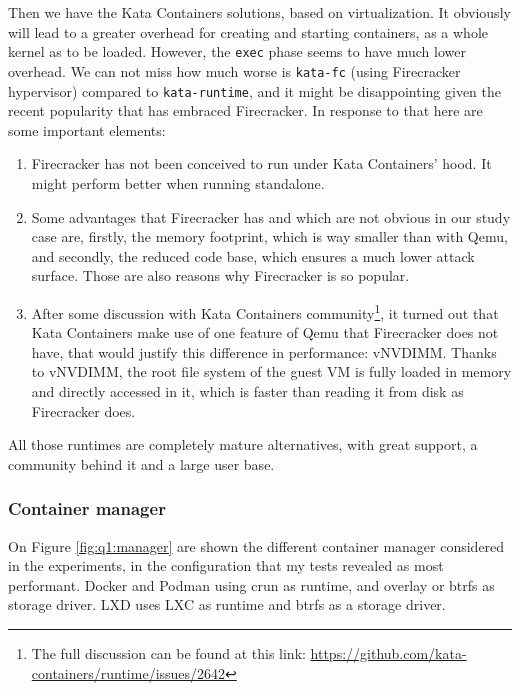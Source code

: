 Then we have the Kata Containers solutions, based on virtualization.  It obviously will lead to a greater overhead for creating and starting containers, as a whole kernel as to be loaded.  However, the \texttt{exec} phase seems to have much lower overhead.  We can not miss how much worse is \texttt{kata-fc} (using Firecracker hypervisor) compared to \texttt{kata-runtime}, and it might be disappointing given the recent popularity that has embraced Firecracker.  In response to that here are some important elements:
\begin{enumerate}
  \item Firecracker has not been conceived to run under Kata Containers' hood.  It might perform better when running standalone.
  \item Some advantages that Firecracker has and which are not obvious in our study case are, firstly, the memory footprint, which is way smaller than with Qemu, and secondly, the reduced code base, which ensures a much lower attack surface.  Those are also reasons why Firecracker is so popular.
  \item After some discussion with Kata Containers community\footnote{The full discussion can be found at this link: \href{https://github.com/kata-containers/runtime/issues/2642}{https://github.com/kata-containers/runtime/issues/2642}}, it turned out that Kata Containers make use of one feature of Qemu that Firecracker does not have, that would justify this difference in performance: vNVDIMM.  Thanks to vNVDIMM, the root file system of the guest VM is fully loaded in memory and directly accessed in it, which is faster than reading it from disk as Firecracker does.
\end{enumerate}

All those runtimes are completely mature alternatives, with great support, a community behind it and a large user base.  

\subsubsection{Container manager}

On Figure \ref{fig:q1:manager} are shown the different container manager considered in the experiments, in the configuration that my tests revealed as most performant.  Docker and Podman using crun as runtime, and overlay or btrfs as storage driver.  LXD uses LXC as runtime and btrfs as a storage driver.

